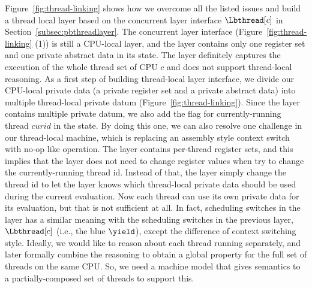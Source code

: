 Figure~\ref{fig:thread-linking} shows how we overcome all the listed issues and build a thread local layer based on the 
 concurrent layer interface $\Lbthread[c]$ in Section~\ref{subsec:pbthreadlayer}.
The concurrent layer interface (Figure~\ref{fig:thread-linking} (1)) is still a CPU-local layer,
and the layer contains only one register set and one private abstract data in its state.
The layer definitely captures the execution of the whole thread set of CPU $c$ 
and does not support thread-local reasoning.
As a first step of building thread-local layer interface, 
we divide our CPU-local private data (a private register set and a private abstract data) into multiple thread-local
private datum (Figure~\ref{fig:thread-linking}). 
Since the layer contains multiple private datum, we also add the flag for currently-running thread $curid$ in the state. 
By doing this one, we can also resolve one challenge in our thread-local machine, which is replacing an assembly style 
context switch with no-op like operation. 
The layer contains per-thread register sets, and this implies that the layer does not need to change register values 
when try to change the currently-running thread id. 
Instead of that, the layer simply change the thread id to let the layer knows which thread-local private data should be 
used during the current evaluation.
Now each thread can use its own private data for its evaluation, but that is not sufficient at all. 
In fact, scheduling switches in the layer has a similar meaning with the scheduling switches in the previous layer, 
$\Lbthread[c]$ (i.e., the blue $\yield$), except the difference of context switching style.
Ideally, we would like to reason about each thread running 
separately, and later formally combine the reasoning to obtain a global
property for the full set of threads on the same CPU.
So, we need a machine model that gives semantics to
a partially-composed set of threads to support this.


